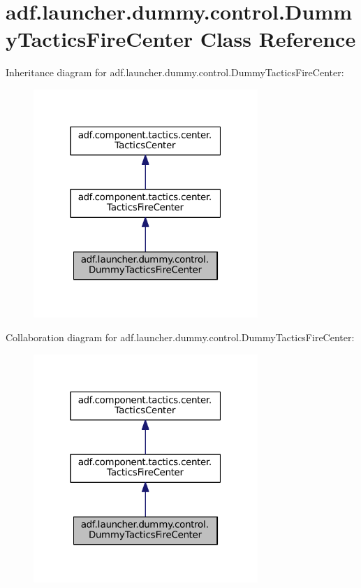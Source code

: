 \hypertarget{classadf_1_1launcher_1_1dummy_1_1control_1_1DummyTacticsFireCenter}{}\section{adf.\+launcher.\+dummy.\+control.\+Dummy\+Tactics\+Fire\+Center Class Reference}
\label{classadf_1_1launcher_1_1dummy_1_1control_1_1DummyTacticsFireCenter}


Inheritance diagram for adf.\+launcher.\+dummy.\+control.\+Dummy\+Tactics\+Fire\+Center\+:
\nopagebreak
\begin{figure}[H]
\begin{center}
\leavevmode
\includegraphics[width=241pt]{classadf_1_1launcher_1_1dummy_1_1control_1_1DummyTacticsFireCenter__inherit__graph}
\end{center}
\end{figure}


Collaboration diagram for adf.\+launcher.\+dummy.\+control.\+Dummy\+Tactics\+Fire\+Center\+:
\nopagebreak
\begin{figure}[H]
\begin{center}
\leavevmode
\includegraphics[width=241pt]{classadf_1_1launcher_1_1dummy_1_1control_1_1DummyTacticsFireCenter__coll__graph}
\end{center}
\end{figure}
